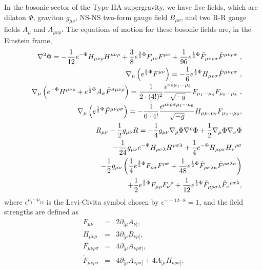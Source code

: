 \documentclass[a4paper,12pt]{article}
\numberwithin{equation}{section}
\begin{document}
In the bosonic sector of the Type IIA supergravity, we have five
fields, which are dilaton $\Phi$, graviton $g_{\mu\nu}$, NS-NS
two-form gauge field $B_{\mu\nu}$, and two R-R gauge fields $A_\mu$
and $A_{\mu\nu\rho}$.  The equations of motion for these bosonic
fields are, in the Einstein frame,
\begin{eqnarray}
&& \nabla^2 \Phi =
         - \frac1{12} e^{-\Phi} H_{\mu\nu\rho} H^{\mu\nu\rho}
         + \frac38 e^{\frac32 \Phi} F_{\mu\nu} F^{\mu\nu}
         + \frac1{96} e^{\frac12\Phi}  \tilde{F}_{\mu\nu\rho\sigma}
                                     \tilde{F}^{\mu\nu\rho\sigma} ~,
\label{EQ1} \\
&& \nabla_\mu \left( e^{\frac32 \Phi} F^{\mu\nu} \right) =
         - \frac16 e^{\frac12 \Phi} H_{\mu\rho\sigma}
                           \tilde{F}^{\mu\nu\rho\sigma} ~,
\label{EQ2} \\
&& \nabla_\mu \left(  e^{-\Phi} H^{\mu\nu\rho}
                    + e^{\frac{1}{2} \Phi} A_\sigma
                           \tilde{F}^{\sigma\mu\nu\rho}
              \right) =
   \frac{1}{2\cdot (4!)^2}
   \frac{\epsilon^{\nu\rho \mu_1\cdots \mu_8}}{\sqrt{-g}}
              F_{\mu_1 \cdots \mu_4} F_{\mu_5 \cdots \mu_8} ~,
\label{EQ3} \\
&& \nabla_\mu \left( e^{\frac12 \Phi} \tilde{F}^{\mu\nu\rho\sigma}
              \right) =
      -\frac1{6\cdot 4!}
       \frac{\epsilon^{\mu\nu\rho\sigma\mu_1\cdots \mu_6}}{\sqrt{-g}}
        H_{\mu\mu_1\mu_2} F_{\mu_3\cdots \mu_6},
\label{EQ4} \\
&& R_{\mu\nu} - \frac12 g_{\mu\nu} R =
      - \frac14 g_{\mu\nu} \nabla_\rho \Phi \nabla^\rho \Phi
      + \frac12 \nabla_\mu\Phi\nabla_\nu\Phi
\nonumber \\
&&\hskip 29mm
      - \frac1{24} g_{\mu\nu} e^{-\Phi}
             H_{\rho\sigma\lambda} H^{\rho\sigma\lambda}
      + \frac14 e^{-\Phi} H_{\mu\rho\sigma} H_\nu{}^{\rho\sigma}
\nonumber \\
&&\hskip 29mm
      -\frac12 g_{\mu\nu}
       \left(  \frac14 e^{\frac32\Phi} F_{\rho\sigma} F^{\rho\sigma}
             + \frac1{48} e^{\frac12\Phi}
                   \tilde{F}_{\rho\sigma\lambda\kappa}
                   \tilde{F}^{\rho\sigma\lambda\kappa}
       \right)
\nonumber \\
&&\hskip 29mm
     + \frac12 e^{\frac32 \Phi} F_{\mu\rho} F_\nu{}^\rho
     + \frac1{12} e^{\frac12 \Phi}
                \tilde{F}_{\mu\rho\sigma\lambda}
                \tilde{F}_\nu{}^{\rho\sigma\lambda},
\label{EQ5}
\end{eqnarray}
where $\epsilon^{\mu_1\cdots \mu_{10}}$ is the Levi-Civita symbol
chosen by $\epsilon^{+-12\cdots 8} = 1$, and the field strengths are
defined as
\begin{eqnarray}
F_{\mu\nu} &=& 2 \partial_{[\mu} A_{\nu]}, \nonumber \\
H_{\mu\nu\rho} &=& 3 \partial_{[\mu} B_{\nu\rho]},  \nonumber \\
F_{\mu\nu\rho\sigma} &=& 4 \partial_{[\mu} A_{\nu\rho\sigma]}, \nonumber \\
\tilde F_{\mu\nu\rho\sigma} &=& 4 \partial_{[\mu}
A_{\nu\rho\sigma]} + 4 A_{[\mu} H_{\nu\rho\sigma]}.  \nonumber
\end{eqnarray}
\end{document}
